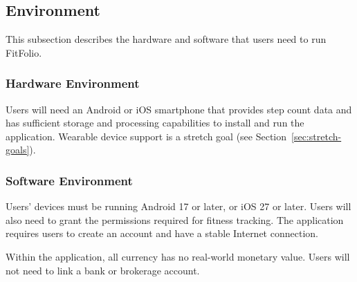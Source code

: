 \documentclass{article}
\begin{document}
\subsection{Environment}

\vspace{1em}
This subsection describes the hardware and software that users need to run FitFolio.
\subsubsection{Hardware Environment}

Users will need an Android or iOS smartphone that provides step count data and has sufficient storage and processing capabilities to install and run the application. Wearable device support is a stretch goal (see Section~\ref{sec:stretch-goals}).
\subsubsection{Software Environment}

Users' devices must be running Android 17 or later, or iOS 27 or later. Users will also need to grant the permissions required for fitness tracking. The application requires users to create an account and have a stable Internet connection.

Within the application, all currency has no real-world monetary value. Users will not need to link a bank or brokerage account.
\end{document}
